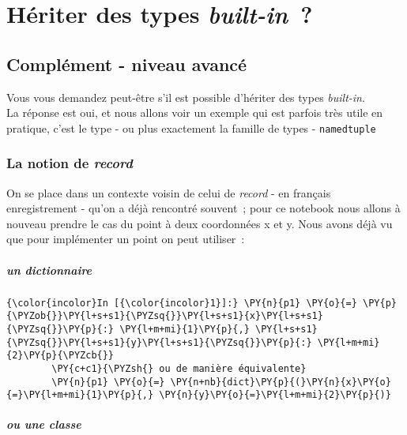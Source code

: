     \hypertarget{huxe9riter-des-types-built-in}{%
\section{\texorpdfstring{Hériter des types
\emph{built-in}~?}{Hériter des types built-in~?}}\label{huxe9riter-des-types-built-in}}

    \hypertarget{compluxe9ment---niveau-avancuxe9}{%
\subsection{Complément - niveau
avancé}\label{compluxe9ment---niveau-avancuxe9}}

    Vous vous demandez peut-être s'il est possible d'hériter des types
\emph{built-in}.\\

    La réponse est oui, et nous allons voir un exemple qui est parfois très
utile en pratique, c'est le type - ou plus exactement la famille de
types - \texttt{namedtuple}

    \hypertarget{la-notion-de-record}{%
\subsubsection{\texorpdfstring{La notion de
\emph{record}}{La notion de record}}\label{la-notion-de-record}}

    On se place dans un contexte voisin de celui de \emph{record} - en
français enregistrement - qu'on a déjà rencontré souvent~; pour ce
notebook nous allons à nouveau prendre le cas du point à deux
coordonnées x et y. Nous avons déjà vu que pour implémenter un point on
peut utiliser~:

    \hypertarget{un-dictionnaire}{%
\subparagraph{un dictionnaire}\label{un-dictionnaire}}

    \begin{Verbatim}[commandchars=\\\{\}]
{\color{incolor}In [{\color{incolor}1}]:} \PY{n}{p1} \PY{o}{=} \PY{p}{\PYZob{}}\PY{l+s+s1}{\PYZsq{}}\PY{l+s+s1}{x}\PY{l+s+s1}{\PYZsq{}}\PY{p}{:} \PY{l+m+mi}{1}\PY{p}{,} \PY{l+s+s1}{\PYZsq{}}\PY{l+s+s1}{y}\PY{l+s+s1}{\PYZsq{}}\PY{p}{:} \PY{l+m+mi}{2}\PY{p}{\PYZcb{}}
        \PY{c+c1}{\PYZsh{} ou de manière équivalente}
        \PY{n}{p1} \PY{o}{=} \PY{n+nb}{dict}\PY{p}{(}\PY{n}{x}\PY{o}{=}\PY{l+m+mi}{1}\PY{p}{,} \PY{n}{y}\PY{o}{=}\PY{l+m+mi}{2}\PY{p}{)}
\end{Verbatim}


    \hypertarget{ou-une-classe}{%
\subparagraph{ou une classe}\label{ou-une-classe}}

